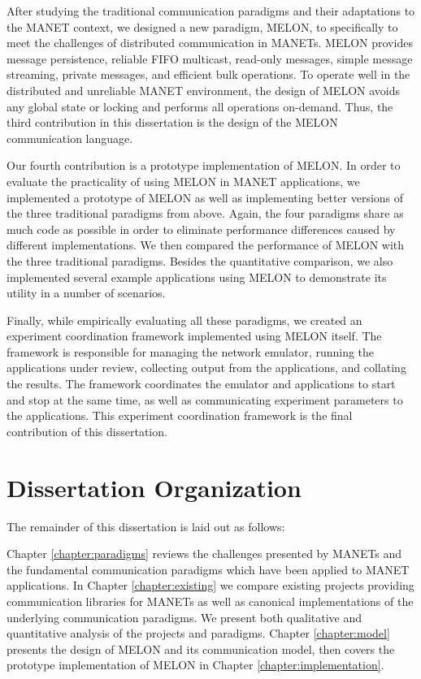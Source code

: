 After studying the traditional communication paradigms and their adaptations to the MANET context, we designed a new paradigm, MELON, to specifically to meet the challenges of distributed communication in MANETs. MELON provides message persistence, reliable FIFO multicast, read-only messages, simple message streaming, private messages, and efficient bulk operations. To operate well in the distributed and unreliable MANET environment, the design of MELON avoids any global state or locking and performs all operations on-demand. Thus, the third contribution in this dissertation is the design of the MELON communication language.

Our fourth contribution is a prototype implementation of MELON. In order to evaluate the practicality of using MELON in MANET applications, we implemented a prototype of MELON as well as implementing better versions of the three traditional paradigms from above. Again, the four paradigms share as much code as possible in order to eliminate performance differences caused by different implementations. We then compared the performance of MELON with the three traditional paradigms. Besides the quantitative comparison, we also implemented several example applications using MELON to demonstrate its utility in a number of scenarios.

Finally, while empirically evaluating all these paradigms, we created an experiment coordination framework implemented using MELON itself. The framework is responsible for managing the network emulator, running the applications under review, collecting output from the applications, and collating the results. The framework coordinates the emulator and applications to start and stop at the same time, as well as communicating experiment parameters to the applications. This experiment coordination framework is the final contribution of this dissertation.

\section{Dissertation Organization}

The remainder of this dissertation is laid out as follows:

Chapter \ref{chapter:paradigms} reviews the challenges presented by MANETs and the fundamental communication paradigms which have been applied to MANET applications. In Chapter \ref{chapter:existing} we compare existing projects providing communication libraries for MANETs as well as canonical implementations of the underlying communication paradigms. We present both qualitative and quantitative analysis of the projects and paradigms. Chapter \ref{chapter:model} presents the design of MELON and its communication model, then covers the prototype implementation of MELON in Chapter \ref{chapter:implementation}.

